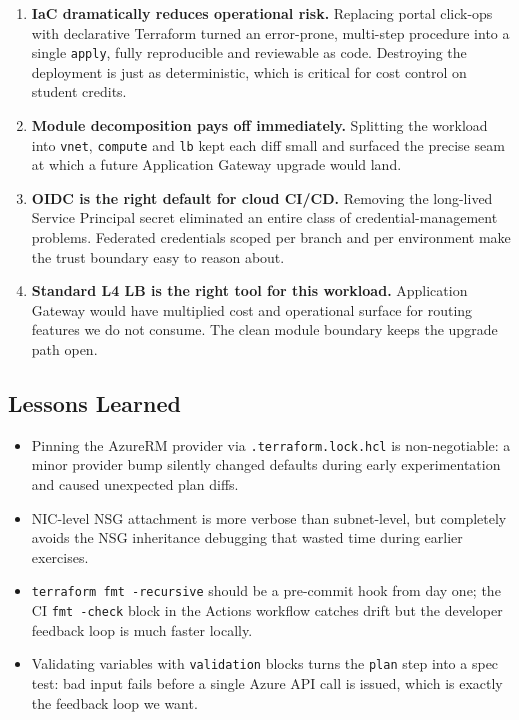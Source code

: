 \documentclass[10pt,a4paper,twocolumn]{article}
\begin{document}
\begin{resultbox}[title={Key Findings}]
\begin{enumerate}
  \item \textbf{IaC dramatically reduces operational risk.} Replacing
        portal click-ops with declarative Terraform turned an
        error-prone, multi-step procedure into a single
        \texttt{apply}, fully reproducible and reviewable as code.
        Destroying the deployment is just as deterministic, which is
        critical for cost control on student credits.
  \item \textbf{Module decomposition pays off immediately.} Splitting
        the workload into \texttt{vnet}, \texttt{compute} and
        \texttt{lb} kept each diff small and surfaced the precise
        seam at which a future Application Gateway upgrade would land.
  \item \textbf{OIDC is the right default for cloud CI/CD.} Removing
        the long-lived Service Principal secret eliminated an entire
        class of credential-management problems. Federated credentials
        scoped per branch and per environment make the trust boundary
        easy to reason about.
  \item \textbf{Standard L4 LB is the right tool for this workload.}
        Application Gateway would have multiplied cost and operational
        surface for routing features we do not consume. The clean
        module boundary keeps the upgrade path open.
\end{enumerate}
\end{resultbox}

\subsection{Lessons Learned}

\begin{itemize}
  \item Pinning the AzureRM provider via \texttt{.terraform.lock.hcl}
        is non-negotiable: a minor provider bump silently changed
        defaults during early experimentation and caused unexpected
        plan diffs.
  \item NIC-level NSG attachment is more verbose than subnet-level,
        but completely avoids the NSG inheritance debugging that
        wasted time during earlier exercises.
  \item \texttt{terraform fmt -recursive} should be a pre-commit hook
        from day one; the CI \texttt{fmt -check} block in the Actions
        workflow catches drift but the developer feedback loop is
        much faster locally.
  \item Validating variables with \texttt{validation} blocks turns the
        \texttt{plan} step into a spec test: bad input fails before a
        single Azure API call is issued, which is exactly the
        feedback loop we want.
\end{itemize}
\end{document}
